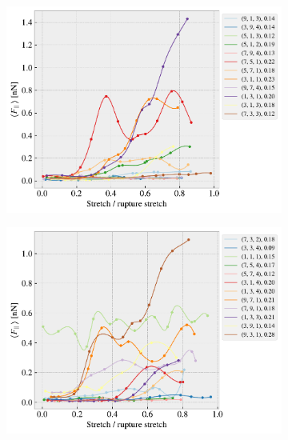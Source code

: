 \begin{figure}[H]
\begin{subfigure}[b]{0.49\textwidth}
        \centering
        \includegraphics[width=\textwidth]{figures/stretch_profiles/popup/SP_2_popup.pdf}
        \caption{}
        \label{fig:}
    \end{subfigure}
    \hfill
    \begin{subfigure}[b]{0.49\textwidth}
        \centering
        \includegraphics[width=\textwidth]{figures/stretch_profiles/popup/SP_3_popup.pdf}
        \caption{}
        \label{fig:}
    \end{subfigure}
    \hfill
    \begin{subfigure}[b]{0.49\textwidth}
        \centering

\end{subfigure}
\end{figure}
